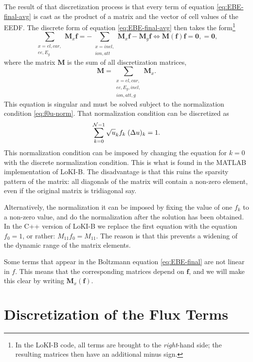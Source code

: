 \documentclass{book}
\newcommand{\bmat}[1]{{\ensuremath{\bm {#1}}}}
\newcommand{\bvec}[1]{{\ensuremath{\bm {#1}}}}
\begin{document}
The result of that
discretization process is that every term of equation \eqref{eq:EBE-final-avg}
is cast as the product of a matrix and the vector of cell values of the EEDF.
The discrete form of equation \eqref{eq:EBE-final-avg} then takes the
form\footnote{
	In the LoKI-B code, all terms are brought to the {\em right}-hand side;
	the resulting matrices then have an additional minus sign.
}
\begin{equation}
	\sum\limits_{\substack{x=el,car,\\ee,E_g}}\bmat{M}_x\bvec{f}
	=
	-\sum\limits_{\substack{x=inel,\\ion,att}}\bmat{M}_x\bvec{f}
	-\bmat{M}_g\bvec{f}
	\iff
	\bmat{M}(\bvec{f})\bvec{f}=\bvec{0},
	=\bvec{0},
\end{equation}
where the matrix $\bmat{M}$ is the sum of all discretization matrices,
\begin{equation}
	\bmat{M} = \sum\limits_{\substack{x=el,car,\\ee,E_g,inel,\\ion,att,g}}\bmat{M}_x.
	\label{eq:M=sum_xM_x}
\end{equation}
This equation is singular and must be solved subject to the normalization
condition \eqref{eq:f0u-norm}. That normalization condition can be discretized
as
\begin{equation}
	\sum\limits_{k=0}^{{\cal N}-1} \sqrt{u}_k f_k \;(\Delta u)_k = 1.
\end{equation}
This normalization condition can be imposed by changing the equation for $k=0$
with the discrete normalization condition. This is what is found in the MATLAB
implementation of LoKI-B. The disadvantage is that this ruins the sparsity
pattern of the matrix: all diagonals of the matrix will contain a non-zero
element, even if the original matrix is tridiagonal say.

Alternatively, the normalization it can be imposed by fixing the value of
one $f_k$ to a non-zero value, and do the normalization after the solution
has been obtained. In the C++ version of LoKI-B we replace the first equation
with the equation $f_0=1$, or rather: $M_{11}f_0=M_{11}$. The reason is that
this prevents a widening of the dynamic range of the matrix elements.

Some terms that appear in the Boltzmann equation \eqref{eq:EBE-final} are not linear
in $f$. This means that the corresponding matrices depend on $\bvec{f}$, and
we will make this clear by writing $\bmat{M}_x(\bvec{f})$.

\section{Discretization of the Flux Terms}
\end{document}
